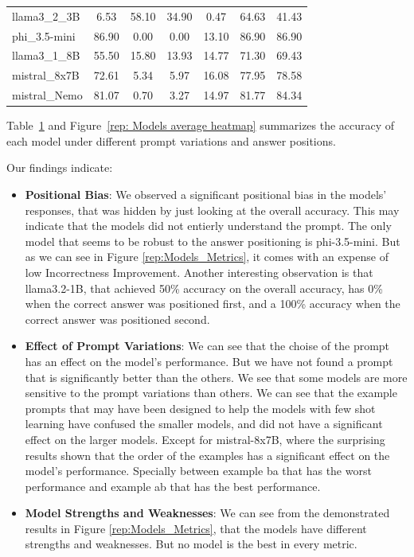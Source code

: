 \begin{table}[htbp]
\begin{tabular}{@{}lcccccc@{}}
    llama3\_2\_3B  & 6.53  & 58.10 & 34.90 & 0.47  & 64.63        & 41.43       \\
    phi\_3.5-mini  & 86.90 & 0.00  & 0.00  & 13.10 & 86.90        & 86.90       \\
    llama3\_1\_8B  & 55.50 & 15.80 & 13.93 & 14.77 & 71.30        & 69.43       \\
    mistral\_8x7B  & 72.61 & 5.34  & 5.97  & 16.08 & 77.95        & 78.58       \\
    mistral\_Nemo  & 81.07 & 0.70  & 3.27  & 14.97 & 81.77        & 84.34       \\ \bottomrule
  \end{tabular}
  \label{tab:combined_results}
\end{table}

Table~\ref{tab:combined_results} and Figure~\ref{rep: Models average heatmap} summarizes the accuracy of each model under different prompt variations and answer positions.

Our findings indicate:

\begin{itemize}
  \item \textbf{Positional Bias}: We observed a significant positional bias in the models' responses, that was hidden by just looking at the overall accuracy. This may indicate that the models did not entierly understand the prompt. The only model that seems to be robust to the answer positioning is phi-3.5-mini. But as we can see in Figure \ref{rep:Models_Metrics}, it comes with an expense of low Incorrectness Improvement. Another interesting observation is that llama3.2-1B, that achieved 50\% accuracy on the overall accuracy, has 0\% when the correct answer was positioned first, and a 100\% accuracy when the correct answer was positioned second.
  \item \textbf{Effect of Prompt Variations}: We can see that the choise of the prompt has an effect on the model's performance. But we have not found a prompt that is significantly better than the others. We see that some models are more sensitive to the prompt variations than others. We can see that the example prompts that may have been designed to help the models with few shot learning have confused the smaller models, and did not have a significant effect on the larger models. Except for mistral-8x7B, where the surprising results shown that the order of the examples has a significant effect on the model's performance. Specially between example ba that has the worst performance and example ab that has the best performance.
  \item \textbf{Model Strengths and Weaknesses}: We can see from the demonstrated results in Figure \ref{rep:Models_Metrics}, that the models have different strengths and weaknesses. But no model is the best in every metric.
\end{itemize}


